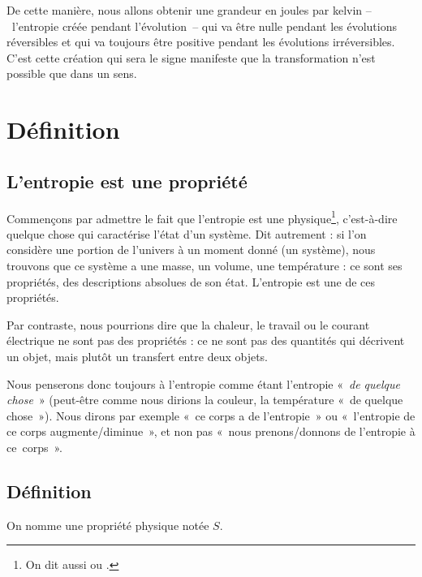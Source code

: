 		De cette manière, nous allons obtenir une grandeur en \si{joules} par \si{kelvin} --\ l’entropie créée pendant l’évolution\ -- qui va être nulle pendant les évolutions réversibles et qui va toujours être positive pendant les évolutions irréversibles. C’est cette création qui sera le signe manifeste que la transformation n’est possible que dans un sens. %

\section{Définition}

	\subsection{L’entropie est une propriété}
	\label{ch_entropie_propriete}
	
		Commençons par admettre le fait que l’entropie est une  physique\footnote{On dit aussi  ou .}, c’est-à-dire quelque chose qui caractérise l’état d’un système. Dit autrement : si l’on considère une portion de l’univers à un moment donné (un système), nous trouvons que ce système a une masse, un volume, une température : ce sont ses propriétés, des descriptions absolues de son état. L’entropie est une de ces propriétés.
		
		Par contraste, nous pourrions dire que la chaleur, le travail ou le courant électrique ne sont pas des propriétés : ce ne sont pas des quantités qui décrivent un objet, mais plutôt un transfert entre deux objets.

		Nous penserons donc toujours à l’entropie comme étant l’entropie «~\emph{de quelque chose}~» (peut-être comme nous dirions la couleur, la température «~de quelque chose~»). Nous dirons par exemple «~ce corps a de l’entropie~» ou «~l’entropie de ce corps augmente/diminue~», et non pas «~nous prenons/donnons de l’entropie à ce~corps~».
	
	\subsection{Définition}
	\label{ch_entropie_definition}
	
		On nomme  une propriété physique notée $S$.
		
